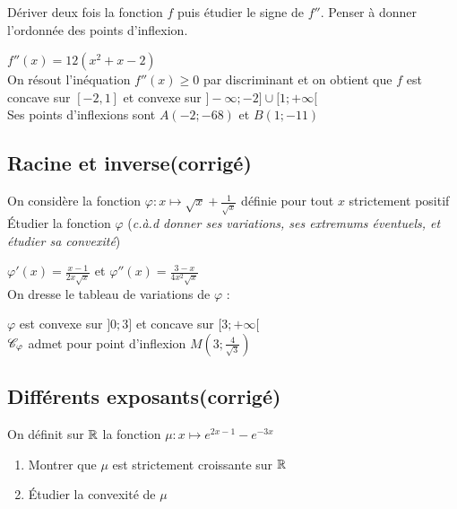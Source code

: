 \documentclass[oneside,12pt]{book}          %
\begin{document}
\begin{hint}
Dériver deux fois la fonction $f$ puis étudier le signe de $f''$. Penser à donner l'ordonnée des points d'inflexion.
\end{hint}
\begin{sol}
$f''(x)=12(x^2+x-2)$\\
On résout l'inéquation $f''(x)\geq0$ par discriminant et on obtient que $f$ est concave sur $[-2,1]$ et convexe sur $]-\infty;-2]\cup[1;+\infty[$\\
Ses points d'inflexions sont $A(-2;-68)$ et $B(1;-11)$
\end{sol}



\subsection{Racine et inverse\quad\small{(corrigé)}}
On considère la fonction $\varphi:x\mapsto \sqrt{x}+\frac{1}{\sqrt{x}}$ définie pour tout $x$ strictement positif\\
Étudier la fonction $\varphi$ (\textit{c.à.d donner ses variations, ses extremums éventuels, et étudier sa convexité})

\begin{sol}
\begin{minipage}{0.5\linewidth}
$\varphi'(x)=\frac{x-1}{2x\sqrt{x}}$ et $\varphi''(x)=\frac{3-x}{4x^2\sqrt{x}}$\\
On dresse le tableau de variations de $\varphi$ :

\end{minipage}
\begin{minipage}{0.5\linewidth}
$\varphi$ est convexe sur $]0;3]$  et concave sur $[3;+\infty[$\\
${\mathscr{C}}_\varphi$ admet pour point d'inflexion $M\left(3;\frac{4}{\sqrt{3}}\right)$\\
\end{minipage}
\end{sol}



\subsection{Différents exposants\quad\small{(corrigé)}}
On définit sur ${\mathbb R}$ la fonction $\mu:x\mapsto e^{2x-1}-e^{-3x}$
\begin{enumerate}
	\item Montrer que $\mu$ est strictement croissante sur ${\mathbb R}$
	\item Étudier la convexité de $\mu$
\end{enumerate}
\end{document}
